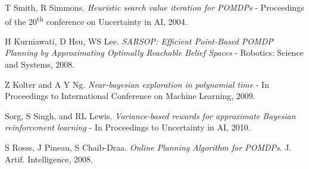 \documentclass{article}
\begin{document}
\begin{thebibliography}{9}

	T Smith, R Simmons. \emph{Heuristic search value iteration for POMDPs} - Proceedings of the 20\textsuperscript{th} conference on Uncertainty in AI, 2004.

	H Kurniawati, D Hsu, WS Lee. \emph{SARSOP: Efﬁcient Point-Based POMDP Planning by Approximating Optimally Reachable Belief Spaces} - Robotics: Science and Systems, 2008.

	Z Kolter and A Y Ng. \emph{Near-bayesian exploration in polynomial time} - In Proceedings to International Conference on Machine Learning, 2009.

	Sorg, S Singh, and RL Lewis. \emph{Variance-based rewards for approximate Bayesian reinforcement learning} - In Proceedings to Uncertainty in AI, 2010.

	S Rosss, J Pineau, S Chaib-Draa. \emph{Online Planning Algorithm for POMDPs}. J. Artif.
	Intelligence, 2008.

\end{thebibliography}
\end{document}
